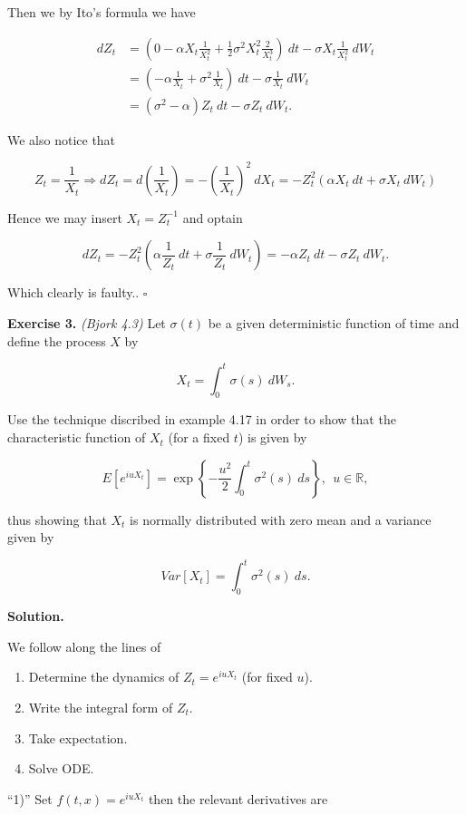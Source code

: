 \documentclass[
]{book}
\providecommand{\tightlist}{%
  \setlength{\itemsep}{0pt}\setlength{\parskip}{0pt}}
\begin{document}
Then we by Ito's formula we have

\begin{align*}
dZ_t&=\left(0-\alpha X_t\frac{1}{X_t^2}+\frac{1}{2} \sigma^2 X_t^2\frac{2}{X_t^3}\right)\ dt-\sigma X_t\frac{1}{X_t^2}\ dW_t\\
&=\left(-\alpha \frac{1}{X_t}+ \sigma^2 \frac{1}{X_t}\right)\ dt-\sigma \frac{1}{X_t}\ dW_t\\
&=(\sigma^2-\alpha)Z_t\ dt-\sigma Z_t\ dW_t.
\end{align*}

We also notice that

\[
Z_t=\frac{1}{X_t}\Rightarrow dZ_t=d\left(\frac{1}{X_t}\right)=-\left(\frac{1}{X_t}\right)^2\ dX_t=-Z_t^2(\alpha X_t\ dt+\sigma X_t\ dW_t)
\]

Hence we may insert \(X_t=Z_t^{-1}\) and optain

\[
dZ_t=-Z_t^2\left(\alpha\frac{1}{Z_t}\ dt + \sigma \frac{1}{Z_t}\ dW_t\right)=-\alpha Z_t\ dt-\sigma Z_t\ dW_t.
\]

Which clearly is faulty.. \(\square\)

\textbf{Exercise 3.} \emph{(Bjork 4.3)} Let \(\sigma(t)\) be a given deterministic function of time and define the process \(X\) by

\[
X_t=\int_0^t\sigma(s)\ dW_s.
\]

Use the technique discribed in example 4.17 in order to show that the characteristic function of \(X_t\) (for a fixed \(t\)) is given by

\[
E[e^{iuX_t}]=\exp\left\{-\frac{u^2}{2}\int_0^t\sigma^2(s)\ ds\right\},\ \ u\in\mathbb{R},
\]

thus showing that \(X_t\) is normally distributed with zero mean and a variance given by

\[
Var[X_t]=\int_0^t\sigma^2(s)\ ds.
\]

\textbf{Solution.}

We follow along the lines of

\begin{enumerate}
\def\labelenumi{\arabic{enumi}.}
\tightlist
\item
  Determine the dynamics of \(Z_t=e^{iuX_t}\) (for fixed \(u\)).
\item
  Write the integral form of \(Z_t\).
\item
  Take expectation.
\item
  Solve ODE.
\end{enumerate}

``1)'' Set \(f(t,x)=e^{iuX_t}\) then the relevant derivatives are
\end{document}
